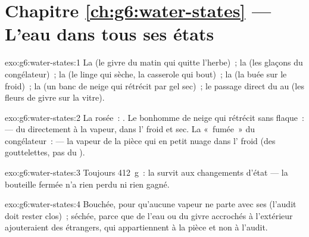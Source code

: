 \section*{Chapitre \ref{ch:g6:water-states} --- L'eau dans tous ses états}

\begin{solution}{exo:g6:water-states:1}
La  (le givre du matin qui quitte l'herbe)~; la 
(les glaçons du congélateur)~; la  (le linge qui sèche,
la casserole qui bout)~; la  (la buée sur le 
froid)~; la  (un banc de neige qui rétrécit par gel sec)~;
le passage direct du  au  (les fleurs de givre sur la
vitre).
\end{solution}

\begin{solution}{exo:g6:water-states:2}
La rosée~: . Le bonhomme de neige qui rétrécit sans
flaque~:  --- du  directement à la vapeur, dans
l' froid et sec. La «~fumée~» du congélateur~:  --- la
vapeur de la pièce qui  en petit nuage dans l' froid
(des gouttelettes, pas du ).
\end{solution}

\begin{solution}{exo:g6:water-states:3}
Toujours \qty{412}{g}~: la  survit aux changements d'état --- la
bouteille fermée n'a rien perdu ni rien gagné.
\end{solution}

\begin{solution}{exo:g6:water-states:4}
Bouchée, pour qu'aucune vapeur ne parte avec ses  (l'audit
doit rester clos)~; séchée, parce que de l'eau ou du givre accrochés
à l'extérieur ajouteraient des  étrangers, qui appartiennent
à la pièce et non à l'audit.
\end{solution}

